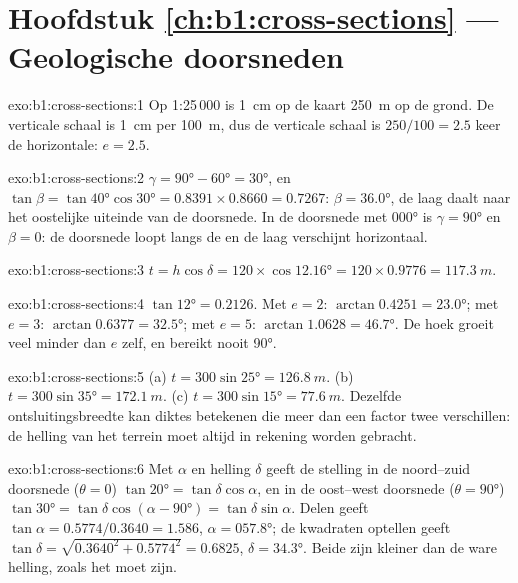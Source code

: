 \section*{Hoofdstuk \ref{ch:b1:cross-sections} --- Geologische doorsneden}

\begin{solution}{exo:b1:cross-sections:1}
Op 1:25\,000 is \qty{1}{cm} op de kaart \qty{250}{m} op de grond. De verticale schaal is
\qty{1}{cm} per \qty{100}{m}, dus de verticale schaal is $250/100 = 2.5$ keer de horizontale: $e = 2.5$.
\end{solution}

\begin{solution}{exo:b1:cross-sections:2}
$\gamma = \ang{90} - \ang{60} = \ang{30}$, en $\tan\beta = \tan\ang{40}
\cos\ang{30} = 0.8391\times0.8660 = 0.7267$: $\beta = \ang{36.0}$, de laag daalt naar het oostelijke
uiteinde van de doorsnede. In de doorsnede met  \ang{000} is $\gamma = \ang{90}$ en $\beta = 0$: de
doorsnede loopt langs de  en de laag verschijnt horizontaal.
\end{solution}

\begin{solution}{exo:b1:cross-sections:3}
$t = h\cos\delta = 120\times\cos\ang{12.16} = 120\times0.9776 =
\qty{117.3}{m}$.
\end{solution}

\begin{solution}{exo:b1:cross-sections:4}
$\tan\ang{12} = 0.2126$. Met $e = 2$: $\arctan 0.4251 = \ang{23.0}$; met
$e = 3$: $\arctan 0.6377 = \ang{32.5}$; met $e = 5$: $\arctan 1.0628 =
\ang{46.7}$. De hoek groeit veel minder dan $e$ zelf, en bereikt nooit
\ang{90}.
\end{solution}

\begin{solution}{exo:b1:cross-sections:5}
(a) $t = 300\sin\ang{25} = \qty{126.8}{m}$. (b) $t = 300\sin\ang{35} =
\qty{172.1}{m}$. (c) $t = 300\sin\ang{15} = \qty{77.6}{m}$. Dezelfde ontsluitingsbreedte
kan diktes betekenen die meer dan een factor twee verschillen: de helling van het terrein
moet altijd in rekening worden gebracht.
\end{solution}

\begin{solution}{exo:b1:cross-sections:6}
Met  $\alpha$ en helling $\delta$ geeft de stelling in de noord--zuid doorsnede
($\theta = 0$) $\tan\ang{20} = \tan\delta\cos\alpha$, en in de oost--west doorsnede
($\theta = \ang{90}$) $\tan\ang{30} =
\tan\delta\cos(\alpha - \ang{90}) = \tan\delta\sin\alpha$. Delen geeft
$\tan\alpha = 0.5774/0.3640 = 1.586$, $\alpha = \ang{057.8}$; de kwadraten optellen geeft
$\tan\delta = \sqrt{0.3640^2 + 0.5774^2} = 0.6825$, $\delta =
\ang{34.3}$. Beide  zijn kleiner dan de ware helling, zoals het moet zijn.
\end{solution}

